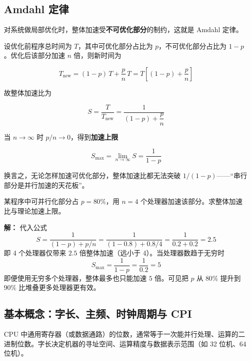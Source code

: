 \subsection{Amdahl 定律}

对系统做局部优化时，整体加速受\textbf{不可优化部分}的制约，这就是 Amdahl 定律。

设优化前程序总时间为 $T$，其中可优化部分占比为 $p$，不可优化部分占比为 $1-p$。优化后该部分加速 $n$ 倍，则新时间为

\begin{equation}
T_{\text{new}} = (1-p)\,T + \frac{p}{n}\,T
= T\left[(1-p) + \frac{p}{n}\right]
\end{equation}

故整体加速比为

\begin{equation}
S = \frac{T}{T_{\text{new}}} = \frac{1}{(1-p) + \dfrac{p}{n}}
\end{equation}

当 $n \to \infty$ 时 $p/n \to 0$，得到\textbf{加速上限}

\begin{equation}
S_{\max} = \lim_{n \to \infty} S = \frac{1}{1-p}
\end{equation}

换言之，无论怎样加速可优化部分，整体加速比都无法突破 $1/(1-p)$——“串行部分是并行加速的天花板”。

\begin{example}
某程序中可并行化部分占 $p = 80\%$，用 $n = 4$ 个处理器加速该部分。求整体加速比与理论加速上限。

\textbf{解：} 代入公式
\begin{equation}
S = \frac{1}{(1-p) + p/n}
= \frac{1}{(1-0.8) + 0.8/4}
= \frac{1}{0.2 + 0.2} = 2.5
\end{equation}
即 4 个处理器仅带来 $2.5$ 倍整体加速（远小于 4）。当处理器数趋于无穷时
\begin{equation}
S_{\max} = \frac{1}{1-p} = \frac{1}{0.2} = 5
\end{equation}
即便使用无穷多个处理器，整体最多也只能加速 $5$ 倍。可见把 $p$ 从 $80\%$ 提升到 $90\%$ 比堆叠更多处理器更有效。
\end{example}

\subsection{基本概念：字长、主频、时钟周期与 CPI}

\begin{definition}[机器字长]
CPU 中通用寄存器（或数据通路）的位数，通常等于一次能并行处理、运算的二进制位数。字长决定机器的寻址空间、运算精度与数据表示范围（如 32 位机、64 位机）。
\end{definition}

